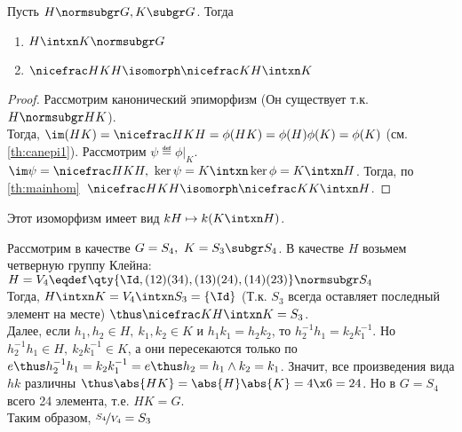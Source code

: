 \begin{theorem}
  Пусть $H\normsubgr G, K\subgr G$. Тогда
  \begin{enumerate}
    \item $H\intxn K\normsubgr G$
    \item $\factorgr{HK}{H}\isomorph \factorgr{K}{H\intxn K}$
  \end{enumerate}
\end{theorem}
\begin{proof}
  Рассмотрим канонический эпиморфизм  (Он существует т.\:к. $H\normsubgr HK$).\\
  Тогда, $\im(HK)=\factorgr{HK}{H}=\phi(HK)=\phi(H)\phi(K)=\phi(K)$ (см. \ref{th:canepi1}). Рассмотрим $\psi\eqdef \phi|_K$. $\im\psi=\factorgr{HK}{H},\ \ker\psi=K\intxn\ker\phi=K\intxn H$. Тогда, по \ref{th:mainhom}\ $\factorgr{HK}{H}\isomorph \factorgr{K}{K\intxn H}$.
\end{proof}
\begin{remark}
  Этот изоморфизм имеет вид $kH\mapsto k(K\intxn H)$.
\end{remark}

\begin{example}
  Рассмотрим в качестве $G=S_4,\ K=S_3\subgr S_4$. В качестве $H$ возьмем четверную группу Клейна: $H=V_4\eqdef\qty{\Id, (1 2)(3 4), (1 3)(2 4), (1 4)(2 3)}\normsubgr S_4$\\
  Тогда, $H\intxn K= V_4\intxn S_3=\{\Id\}$ (Т.\:к. $S_3$ всегда оставляет последный элемент на месте) $\thus\factorgr{K}{H\intxn K}=S_3$.\\
  Далее, если $h_1,h_2\in H,\ k_1,k_2\in K$ и $h_1k_1=h_2k_2$, то $h_2^{-1} h_1=k_2k_1^{-1}$. Но $h_2^{-1} h_1\in H,\ k_2k_1^{-1}\in K$, а они пересекаются только по $e\thus h_2^{-1} h_1=k_2k_1^{-1}=e\thus h_2=h_1 \land k_2=k_1$. Значит, все произведения вида $hk$ различны $\thus \abs{HK}=\abs{H}\abs{K}=4\x6=24$. Но в $G=S_4$ всего 24 элемента, т.\:е. $HK=G$.\\
  Таким образом, $\factorgr{S_4}{V_4}=S_3$
\end{example}

